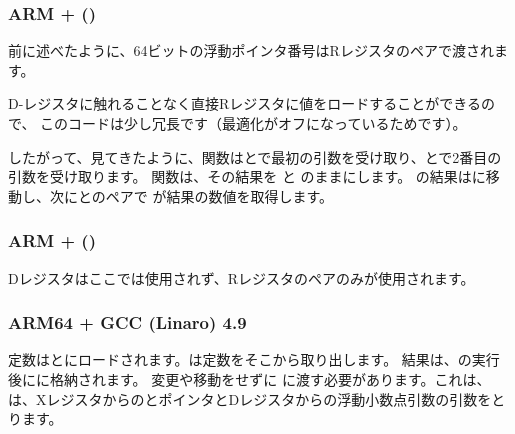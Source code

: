 ﻿\subsubsection{ARM + \NonOptimizingXcodeIV (\ThumbTwoMode)}
\label{FPU_passing_floats_ARM}



前に述べたように、64ビットの浮動ポインタ番号はRレジスタのペアで渡されます。

D-レジスタに触れることなく直接Rレジスタに値をロードすることができるので、
このコードは少し冗長です（最適化がオフになっているためです）。

したがって、見てきたように、関数はとで最初の引数を受け取り、とで2番目の引数を受け取ります。
関数は、その結果を と のままにします。 
の結果はに移動し、次にとのペアで \printf が結果の数値を取得します。

\subsubsection{ARM + \NonOptimizingKeilVI (\ARMMode)}



Dレジスタはここでは使用されず、Rレジスタのペアのみが使用されます。

\subsubsection{ARM64 + \Optimizing GCC (Linaro) 4.9}



定数はとにロードされます。は定数をそこから取り出します。
結果は、の実行後にに格納されます。 
変更や移動をせずに \printf に渡す必要があります。これは、
\printf は、XレジスタからのとポインタとDレジスタからの浮動小数点引数の引数をとります。

